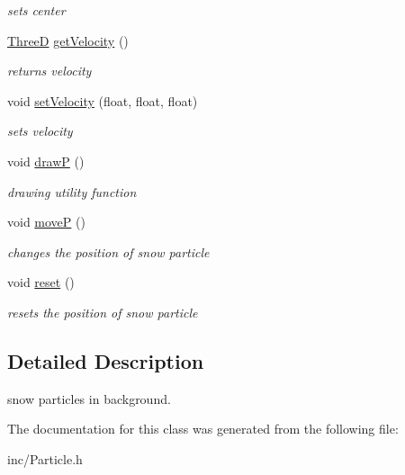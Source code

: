 \begin{DoxyCompactItemize}
\begin{DoxyCompactList}\small\item\em sets center \end{DoxyCompactList}\item 
\hypertarget{class_particle_adfd2e556815078426455241305abfb65}{\hyperlink{global_8h_a62cc051caefbc94bc22d587ea537d9e8}{Three\-D} \hyperlink{class_particle_adfd2e556815078426455241305abfb65}{get\-Velocity} ()}\label{class_particle_adfd2e556815078426455241305abfb65}

\begin{DoxyCompactList}\small\item\em returns velocity \end{DoxyCompactList}\item 
\hypertarget{class_particle_a91ad30eeee984cb8629f50eef6ab7f67}{void \hyperlink{class_particle_a91ad30eeee984cb8629f50eef6ab7f67}{set\-Velocity} (float, float, float)}\label{class_particle_a91ad30eeee984cb8629f50eef6ab7f67}

\begin{DoxyCompactList}\small\item\em sets velocity \end{DoxyCompactList}\item 
\hypertarget{class_particle_afedbd15814f27985408f520d9b3fd310}{void \hyperlink{class_particle_afedbd15814f27985408f520d9b3fd310}{draw\-P} ()}\label{class_particle_afedbd15814f27985408f520d9b3fd310}

\begin{DoxyCompactList}\small\item\em drawing utility function \end{DoxyCompactList}\item 
\hypertarget{class_particle_a61f4d976348cbb640287c2b85e01c3ce}{void \hyperlink{class_particle_a61f4d976348cbb640287c2b85e01c3ce}{move\-P} ()}\label{class_particle_a61f4d976348cbb640287c2b85e01c3ce}

\begin{DoxyCompactList}\small\item\em changes the position of snow particle \end{DoxyCompactList}\item 
\hypertarget{class_particle_a0df75e7ca5475b07c67746d7a7f41e22}{void \hyperlink{class_particle_a0df75e7ca5475b07c67746d7a7f41e22}{reset} ()}\label{class_particle_a0df75e7ca5475b07c67746d7a7f41e22}

\begin{DoxyCompactList}\small\item\em resets the position of snow particle \end{DoxyCompactList}\end{DoxyCompactItemize}


\subsection{Detailed Description}
snow particles in background. 

The documentation for this class was generated from the following file\-:\begin{DoxyCompactItemize}
\item 
inc/Particle.\-h\end{DoxyCompactItemize}
